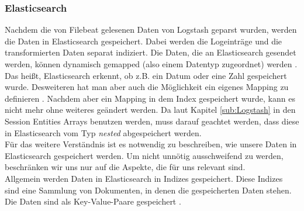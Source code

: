 \subsubsection{Elasticsearch}
\label{ssub:Elasticsearch}
Nachdem die von Filebeat gelesenen Daten von Logstash geparst wurden, werden die Daten in Elasticsearch gespeichert. Dabei werden die Logeinträge und die transformierten Daten separat indiziert. Die Daten, die an Elasticsearch gesendet werden, können dynamisch gemapped (also einem Datentyp zugeordnet) werden \citep{ElMap20}. Das heißt, Elasticsearch erkennt, ob z.B. ein Datum oder eine Zahl gespeichert wurde. Desweiteren hat man aber auch die Möglichkeit ein eigenes Mapping zu definieren \citep{ElMapEx20}. Nachdem aber ein Mapping in dem Index gespeichert wurde, kann es nicht mehr ohne weiteres geändert werden. Da laut Kapitel \ref{sub:Logstash} in den Session Entities Arrays benutzen werden, muss darauf geachtet werden, dass diese in Elasticsearch vom Typ \textit{nested} \citep{Ho16} abgespeichert werden.\\
Für das weitere Verständnis ist es notwendig zu beschreiben, wie unsere Daten in Elasticsearch gespeichert werden. Um nicht unnötig ausschweifend zu werden, beschränken wir uns nur auf die Aspekte, die für uns relevant sind.\\
Allgemein werden Daten in Elasticsearch in Indizes gespeichert. Diese Indizes sind eine Sammlung von Dokumenten, in denen die gespeicherten Daten stehen. Die Daten sind als Key-Value-Paare gespeichert \citep{ElBasic20}. 
